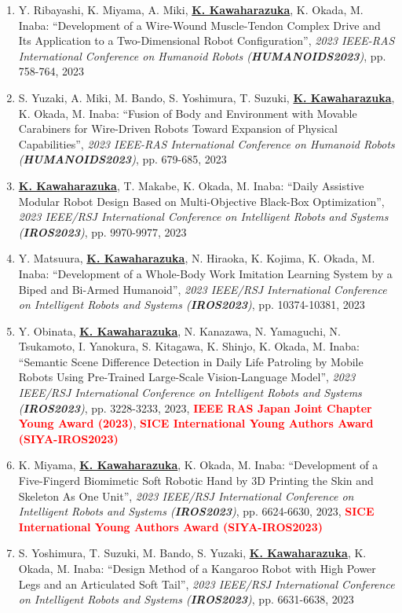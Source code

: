 \documentclass[letterpaper]{article}
\begin{document}
\begin{enumerate}
\item Y. Ribayashi, K. Miyama, A. Miki, \underline{\textbf{K. Kawaharazuka}}, K. Okada, M. Inaba: ``Development of a Wire-Wound Muscle-Tendon Complex Drive and Its Application to a Two-Dimensional Robot Configuration'', \textit{2023 IEEE-RAS International Conference on Humanoid Robots (\textit{\textbf{HUMANOIDS2023}})}, pp. 758-764, 2023
\item S. Yuzaki, A. Miki, M. Bando, S. Yoshimura, T. Suzuki, \underline{\textbf{K. Kawaharazuka}}, K. Okada, M. Inaba: ``Fusion of Body and Environment with Movable Carabiners for Wire-Driven Robots Toward Expansion of Physical Capabilities'', \textit{2023 IEEE-RAS International Conference on Humanoid Robots (\textit{\textbf{HUMANOIDS2023}})}, pp. 679-685, 2023
\item \underline{\textbf{K. Kawaharazuka}}, T. Makabe, K. Okada, M. Inaba: ``Daily Assistive Modular Robot Design Based on Multi-Objective Black-Box Optimization'', \textit{2023 IEEE/RSJ International Conference on Intelligent Robots and Systems (\textit{\textbf{IROS2023}})}, pp. 9970-9977, 2023
\item Y. Matsuura, \underline{\textbf{K. Kawaharazuka}}, N. Hiraoka, K. Kojima, K. Okada, M. Inaba: ``Development of a Whole-Body Work Imitation Learning System by a Biped and Bi-Armed Humanoid'', \textit{2023 IEEE/RSJ International Conference on Intelligent Robots and Systems (\textit{\textbf{IROS2023}})}, pp. 10374-10381, 2023
\item Y. Obinata, \underline{\textbf{K. Kawaharazuka}}, N. Kanazawa, N. Yamaguchi, N. Tsukamoto, I. Yanokura, S. Kitagawa, K. Shinjo, K. Okada, M. Inaba: ``Semantic Scene Difference Detection in Daily Life Patroling by Mobile Robots Using Pre-Trained Large-Scale Vision-Language Model'', \textit{2023 IEEE/RSJ International Conference on Intelligent Robots and Systems (\textit{\textbf{IROS2023}})}, pp. 3228-3233, 2023, \textbf{\textcolor{red}{IEEE RAS Japan Joint Chapter Young Award (2023)}}, \textbf{\textcolor{red}{SICE International Young Authors Award (SIYA-IROS2023)}}
\item K. Miyama, \underline{\textbf{K. Kawaharazuka}}, K. Okada, M. Inaba: ``Development of a Five-Fingerd Biomimetic Soft Robotic Hand by 3D Printing the Skin and Skeleton As One Unit'', \textit{2023 IEEE/RSJ International Conference on Intelligent Robots and Systems (\textit{\textbf{IROS2023}})}, pp. 6624-6630, 2023, \textbf{\textcolor{red}{SICE International Young Authors Award (SIYA-IROS2023)}}
\item S. Yoshimura, T. Suzuki, M. Bando, S. Yuzaki, \underline{\textbf{K. Kawaharazuka}}, K. Okada, M. Inaba: ``Design Method of a Kangaroo Robot with High Power Legs and an Articulated Soft Tail'', \textit{2023 IEEE/RSJ International Conference on Intelligent Robots and Systems (\textit{\textbf{IROS2023}})}, pp. 6631-6638, 2023

\end{enumerate}
\end{document}
